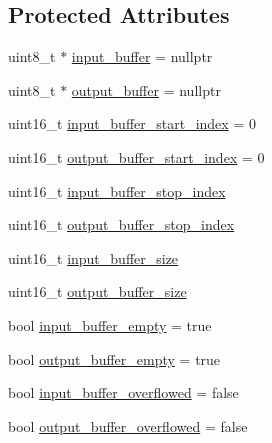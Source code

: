 \subsection*{Protected Attributes}
\begin{DoxyCompactItemize}
\item 
uint8\-\_\-t $\ast$ \hyperlink{class_stream_a81139fc126566f9d42470fdb405ed26a}{input\-\_\-buffer} = nullptr
\item 
uint8\-\_\-t $\ast$ \hyperlink{class_stream_a3cd072a10ad5c1b6308dd2da2cdbec71}{output\-\_\-buffer} = nullptr
\item 
uint16\-\_\-t \hyperlink{class_stream_a6fc009e9e71fa92cbbf9b407ede82a73}{input\-\_\-buffer\-\_\-start\-\_\-index} = 0
\item 
uint16\-\_\-t \hyperlink{class_stream_a1b2d63accede402e5c4c7fd3747d4c33}{output\-\_\-buffer\-\_\-start\-\_\-index} = 0
\item 
uint16\-\_\-t \hyperlink{class_stream_aaceece6a2defd1f7d9667fcc0be03a7a}{input\-\_\-buffer\-\_\-stop\-\_\-index}
\item 
uint16\-\_\-t \hyperlink{class_stream_a39d177eedd4d5ff28a95cca9131daf4c}{output\-\_\-buffer\-\_\-stop\-\_\-index}
\item 
uint16\-\_\-t \hyperlink{class_stream_a7373b1d6580a2d5dc74e788b3bb6a596}{input\-\_\-buffer\-\_\-size}
\item 
uint16\-\_\-t \hyperlink{class_stream_a0e9fd6570bafb97ab76ebd37158e78ff}{output\-\_\-buffer\-\_\-size}
\item 
bool \hyperlink{class_stream_aff1c899af0d2dea35700d5665f378cd8}{input\-\_\-buffer\-\_\-empty} = true
\item 
bool \hyperlink{class_stream_a54b21caaee0001e44968fb70d0a591f5}{output\-\_\-buffer\-\_\-empty} = true
\item 
bool \hyperlink{class_stream_ae7300cb8941cec142c14e8fc9baab9d3}{input\-\_\-buffer\-\_\-overflowed} = false
\item 
bool \hyperlink{class_stream_a149776fead5c56894699da5bfe489b65}{output\-\_\-buffer\-\_\-overflowed} = false
\end{DoxyCompactItemize}


